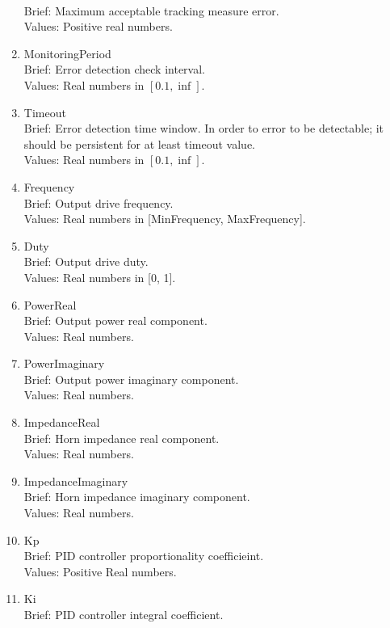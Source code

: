 \documentclass{article}
\begin{document}
\begin{enumerate}
            \\ Brief: Maximum acceptable tracking measure error.
            \\ Values: Positive real numbers.
      \item MonitoringPeriod
            \\ Brief: Error detection check interval. 
            \\ Values: Real numbers in $[0.1, \inf]$.
      \item Timeout
            \\ Brief: Error detection time window. In order to error to be detectable;
            it should be persistent for at least timeout value.
            \\ Values: Real numbers in $[0.1, \inf]$.
      \item Frequency
            \\ Brief: Output drive frequency.
            \\ Values: Real numbers in [MinFrequency, MaxFrequency].
      \item Duty
            \\ Brief: Output drive duty.
            \\ Values: Real numbers in [0, 1].
      \item PowerReal
            \\ Brief: Output power real component.
            \\ Values: Real numbers.
      \item PowerImaginary
            \\ Brief: Output power imaginary component.
            \\ Values: Real numbers.
      \item ImpedanceReal
            \\ Brief: Horn impedance real component.
            \\ Values: Real numbers.
      \item ImpedanceImaginary
            \\ Brief: Horn impedance imaginary component.
            \\ Values: Real numbers.
      \item Kp
            \\ Brief: PID controller proportionality coefficieint.
            \\ Values: Positive Real numbers.
      \item Ki
            \\ Brief: PID controller integral coefficient.

\end{enumerate}
\end{document}
